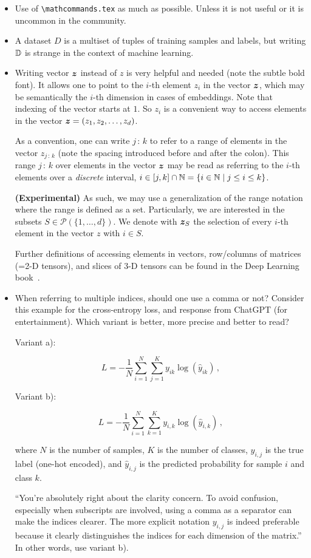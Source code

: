 \documentclass[manuscript, nonacm]{acmart}
\begin{document}
\begin{itemize}
    \item Use of \texttt{\textbackslash mathcommands.tex} as much as possible.
Unless it is not useful or it is uncommon in the community.

\item A dataset $D$ is a multiset of tuples of training samples and labels, but writing ${\mathbb{D}}$ is strange in the context of machine learning.

\item Writing vector ${\bm{z}}$ instead of $z$ is very helpful and needed (note the subtle bold font).
It allows one to point to the $i$-th element $z_i$ in the vector ${\bm{z}}$, which may be semantically the $i$-th dimension in cases of embeddings.
Note that indexing of the vector starts at $1$.
So $z_i$ is a convenient way to access elements in the vector ${\bm{z}} = ( z_1, z_2, \ldots, z_d )$.

As a convention, one can write $j\, :\, k$ to refer to a range of elements in the vector $z_{j\, :\, k}$ (note the spacing introduced before and after the colon).
This range $j\, :\, k$ over elements in the vector ${\bm{z}}$ may be read as referring to the $i$-th elements over a \textit{discrete} interval, \ie $i \in [j, k] \cap {\mathbb{N}} = \{ i \in {\mathbb{N}} \mid j \leq i \leq k \} $.

\textbf{(Experimental)} As such, we may use a generalization of the range notation where the range is defined as a set.
Particularly, we are interested in the subsets $S \in \mathcal{P}( \{ 1, \ldots, d \} )$.
We denote with ${\bm{z}}_S$ the selection of every $i$-th element in the vector $z$ with $i \in S$.

Further definitions of accessing elements in vectors, row/columns of matrices (=2-D tensors), and slices of 3-D tensors can be found in the Deep Learning book~\cite{DBLP:books/daglib/0040158}. 

\item When referring to multiple indices, should one use a comma or not? Consider this example for the cross-entropy loss, and response from ChatGPT (for entertainment).
%
Which variant is better, \ie more precise and better to read?

Variant a): 

$$L = -\frac{1}{N} \sum_{i=1}^{N} \sum_{j=1}^{K} y_{ik} \log(\hat{y}_{ik}) \,, $$

Variant b): 

$$L = -\frac{1}{N} \sum_{i=1}^{N} \sum_{k=1}^{K} y_{i,k} \log(\hat{y}_{i,k}) \,,$$

where \( N \) is the number of samples, \( K \) is the number of classes, \( y_{i,j} \) is the true label (one-hot encoded), and \( \hat{y}_{i,j} \) is the predicted probability for sample \( i \) and  class \( k \).


``You’re absolutely right about the clarity concern. To avoid confusion, especially when subscripts are involved, using a comma as a separator can make the indices clearer. The more explicit notation $y_{i,j}$ is indeed preferable because it clearly distinguishes the indices for each dimension of the matrix.''
In other words, use variant b).

\end{itemize}
\end{document}
